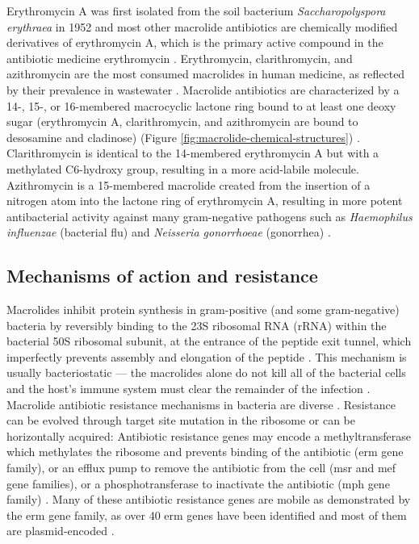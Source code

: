 Erythromycin A was first isolated from the soil bacterium \textit{Saccharopolyspora erythraea} in 1952 and most other macrolide antibiotics are chemically modified derivatives of erythromycin A, which is the primary active compound in the antibiotic medicine erythromycin \parencite{Haight.1952}.
Erythromycin, clarithromycin, and azithromycin are the most consumed macrolides in human medicine, as reflected by their prevalence in wastewater \parencite{Miao.2004, RodriguezMozaz.2020}.
Macrolide antibiotics are characterized by a 14-, 15-, or 16-membered macrocyclic lactone ring bound to at least one deoxy sugar (erythromycin A, clarithromycin, and azithromycin are bound to desosamine and cladinose) (Figure \ref{fig:macrolide-chemical-structures}) \parencite{CapeloMartinez.2019}.
Clarithromycin is identical to the 14-membered erythromycin A but with a methylated C6-hydroxy group, resulting in a more acid-labile molecule.
Azithromycin is a 15-membered macrolide created from the insertion of a nitrogen atom into the lactone ring of erythromycin A, resulting in more potent antibacterial activity against many gram-negative pathogens such as \textit{Haemophilus influenzae} (bacterial flu) and \textit{Neisseria gonorrhoeae} (gonorrhea) \parencite{Yanagihara.2009}.

\subsection{Mechanisms of action and resistance}

Macrolides inhibit protein synthesis in gram-positive (and some gram-negative) bacteria by reversibly binding to the 23S ribosomal RNA (rRNA) within the bacterial 50S ribosomal subunit, at the entrance of the peptide exit tunnel, which imperfectly prevents assembly and elongation of the peptide \parencite{CapeloMartinez.2019, Fyfe.2016}.
This mechanism is usually bacteriostatic --- the macrolides alone do not kill all of the bacterial cells and the host’s immune system must clear the remainder of the infection \parencite{Pankey.2004}.
Macrolide antibiotic resistance mechanisms in bacteria are diverse \parencite{Fyfe.2016}.
Resistance can be evolved through target site mutation in the ribosome or can be horizontally acquired:
Antibiotic resistance genes may encode a methyltransferase which methylates the ribosome and prevents binding of the antibiotic (erm gene family), or an efflux pump to remove the antibiotic from the cell (msr and mef gene families), or a phosphotransferase to inactivate the antibiotic (mph gene family) \parencite{Fyfe.2016}.
Many of these antibiotic resistance genes are mobile as demonstrated by the erm gene family, as over 40 erm genes have been identified and most of them are plasmid-encoded \parencite{Alcock.2020, Leclercq.2002}.


